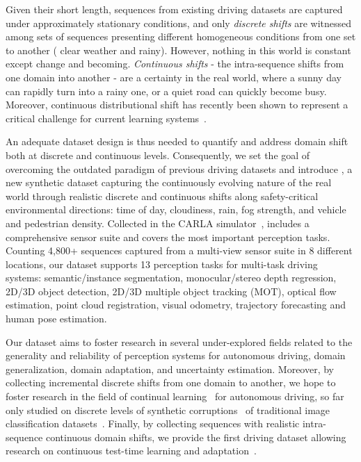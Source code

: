 Given their short length, sequences from existing driving datasets are captured under approximately stationary conditions, and only \textit{discrete shifts} are witnessed among sets of sequences presenting different homogeneous conditions from one set to another (\eg{} clear weather and rainy).
However, nothing in this world is constant except change and becoming.
\textit{Continuous shifts} - the intra-sequence shifts from one domain into another - are a certainty in the real world, where a sunny day can rapidly turn into a rainy one, or a quiet road can quickly become busy.
Moreover, continuous distributional shift has recently been shown to represent a critical challenge for current learning systems~\cite{postels2021practicality}.

An adequate dataset design is thus needed to quantify and address domain shift both at discrete and continuous levels.
Consequently, we set the goal of overcoming the outdated paradigm of previous driving datasets and introduce \thedataset{}, a new synthetic dataset capturing the continuously evolving nature of the real world through realistic discrete and continuous shifts along safety-critical environmental directions: time of day, cloudiness, rain, fog strength, and vehicle and pedestrian density.
Collected in the CARLA simulator~\cite{Dosovitskiy17}, \thedataset{} includes a comprehensive sensor suite and covers the most important perception tasks. Counting 4,800+ sequences captured from a multi-view sensor suite in 8 different locations, our dataset supports 13 perception tasks for multi-task driving systems: semantic/instance segmentation, monocular/stereo depth regression, 2D/3D object detection, 2D/3D multiple object tracking (MOT), optical flow estimation, point cloud registration, visual odometry, trajectory forecasting and human pose estimation.

Our dataset aims to foster research in several under-explored fields related to the generality and reliability of perception systems for autonomous driving, \eg{} domain generalization, domain adaptation, and uncertainty estimation.
Moreover, by collecting incremental discrete shifts from one domain to another, we hope to foster research in the field of continual learning~\cite{wang2020tent,volpi2021continual,hacohen2019power} for autonomous driving, so far only studied on discrete levels of synthetic corruptions~\cite{hendrycks2019robustness} of traditional image classification datasets~\cite{deng2009imagenet,krizhevsky2014cifar}.
Finally, by collecting sequences with realistic intra-sequence continuous domain shifts, we provide the first driving dataset allowing research on continuous test-time learning and adaptation~\cite{wang2020tent,sun2020test,tonioni2019learning,tonioni2019real,poggi2021continual}.  

